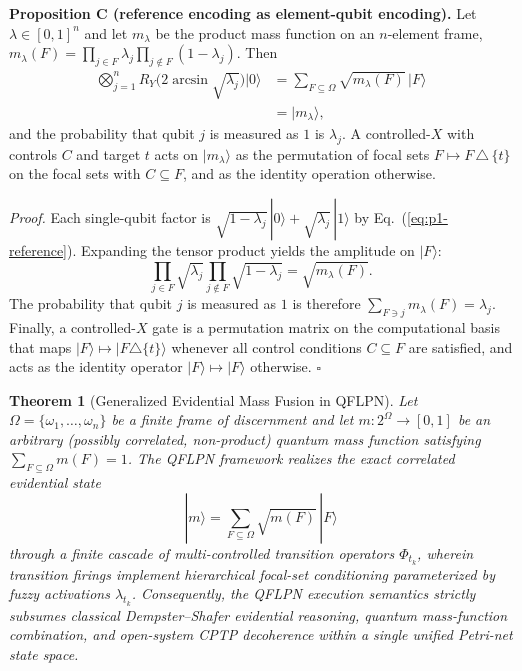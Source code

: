 \documentclass[final,3p,times]{elsarticle}
\newtheorem{theorem}{Theorem}
\begin{document}
\noindent\textbf{Proposition C (reference encoding as element-qubit encoding).} Let $\lambda\in[0,1]^n$ and let $m_\lambda$ be the product mass function on an $n$-element frame, $m_\lambda(F)=\prod_{j\in F}\lambda_j\prod_{j\notin F}(1-\lambda_j)$. Then
\begin{equation}\label{eq:prop-c-encoding}
\begin{aligned}
    \bigotimes_{j=1}^{n}R_Y\!\big(2\arcsin\sqrt{\lambda_j}\big)|0\rangle
    &= \sum_{F \subseteq \Omega}\sqrt{m_\lambda(F)}\,|F\rangle \\
    &= |m_\lambda\rangle ,
\end{aligned}
\end{equation}
and the probability that qubit $j$ is measured as $1$ is $\lambda_j$. A controlled-$X$ with controls $C$ and target $t$ acts on $|m_\lambda\rangle$ as the permutation of focal sets $F\mapsto F\,\triangle\,\{t\}$ on the focal sets with $C\subseteq F$, and as the identity operation otherwise.

\noindent\textit{Proof.} Each single-qubit factor is $\sqrt{1-\lambda_j}\,|0\rangle+\sqrt{\lambda_j}\,|1\rangle$ by Eq.~(\ref{eq:p1-reference}). Expanding the tensor product yields the amplitude on $|F\rangle$:
\begin{equation}
    \prod_{j\in F}\sqrt{\lambda_j}\prod_{j\notin F}\sqrt{1-\lambda_j}=\sqrt{m_\lambda(F)}.
\end{equation}
The probability that qubit $j$ is measured as $1$ is therefore $\sum_{F\ni j}m_\lambda(F)=\lambda_j$. Finally, a controlled-$X$ gate is a permutation matrix on the computational basis that maps $|F\rangle \mapsto |F\triangle\{t\}\rangle$ whenever all control conditions $C \subseteq F$ are satisfied, and acts as the identity operator $|F\rangle \mapsto |F\rangle$ otherwise. $\square$

\begin{theorem}[Generalized Evidential Mass Fusion in QFLPN]\label{thm:evidential-fusion}
Let $\Omega = \{\omega_1,\ldots,\omega_n\}$ be a finite frame of discernment and let $m: 2^\Omega \to [0,1]$ be an arbitrary (possibly correlated, non-product) quantum mass function satisfying $\sum_{F \subseteq \Omega} m(F) = 1$. The QFLPN framework realizes the exact correlated evidential state
\begin{equation}
    |m\rangle = \sum_{F \subseteq \Omega} \sqrt{m(F)}\,|F\rangle
\end{equation}
through a finite cascade of multi-controlled transition operators $\Phi_{t_k}$, wherein transition firings implement hierarchical focal-set conditioning parameterized by fuzzy activations $\lambda_{t_k}$. Consequently, the QFLPN execution semantics strictly subsumes classical Dempster--Shafer evidential reasoning, quantum mass-function combination, and open-system CPTP decoherence within a single unified Petri-net state space.
\end{theorem}
\end{document}
